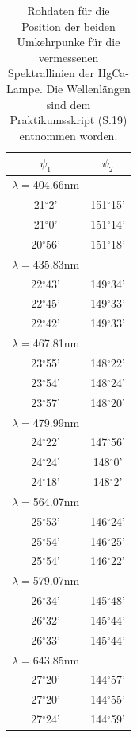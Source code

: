 \documentclass[12pt,a4paper]{article}
\begin{document}
\begin{table}
\begin{center}
\begin{tabular}{|c|c|}
\hline
$\psi_1$ & $\psi_2$ \\
\hline
$\lambda =$404.66nm & \\
\hline
21$^{\circ}$2' &151$^{\circ}$15' \\
\hline
21$^{\circ}$0' &151$^{\circ}$14' \\
\hline
20$^{\circ}$56' &151$^{\circ}$18' \\ 
\hline
$\lambda =$435.83nm & \\
\hline
22$^{\circ}$43' &149$^{\circ}$34' \\
\hline
22$^{\circ}$45' &149$^{\circ}$33' \\ 
\hline
22$^{\circ}$42' &149$^{\circ}$33' \\ 
\hline
$\lambda =$467.81nm & \\
\hline
23$^{\circ}$55' &148$^{\circ}$22' \\
\hline
23$^{\circ}$54' &148$^{\circ}$24' \\
\hline
23$^{\circ}$57' &148$^{\circ}$20' \\ 
\hline
$\lambda =$479.99nm & \\
\hline
24$^{\circ}$22' &147$^{\circ}$56' \\ 
\hline
24$^{\circ}$24' &148$^{\circ}$0' \\ 
\hline
24$^{\circ}$18' &148$^{\circ}$2' \\ 
\hline
$\lambda =$564.07nm & \\
\hline
25$^{\circ}$53' &146$^{\circ}$24' \\
\hline
25$^{\circ}$54' &146$^{\circ}$25' \\
\hline
25$^{\circ}$54' &146$^{\circ}$22' \\ 
\hline
$\lambda =$579.07nm & \\
\hline
26$^{\circ}$34' &145$^{\circ}$48' \\
\hline
26$^{\circ}$32' &145$^{\circ}$44' \\
\hline
26$^{\circ}$33' &145$^{\circ}$44' \\ 
\hline
$\lambda =$643.85nm & \\
\hline
27$^{\circ}$20' &144$^{\circ}$57' \\
\hline
27$^{\circ}$20' &144$^{\circ}$55' \\
\hline
27$^{\circ}$24' &144$^{\circ}$59' \\
\hline
\end{tabular}
\caption{Rohdaten für die Position der beiden Umkehrpunke für die vermessenen Spektrallinien der HgCa-Lampe. Die Wellenlängen sind dem Praktikumsskript (S.19) entnommen worden.}
\label{tab:RohdatenDispersion}
\end{center}
\end{table}
\end{document}
